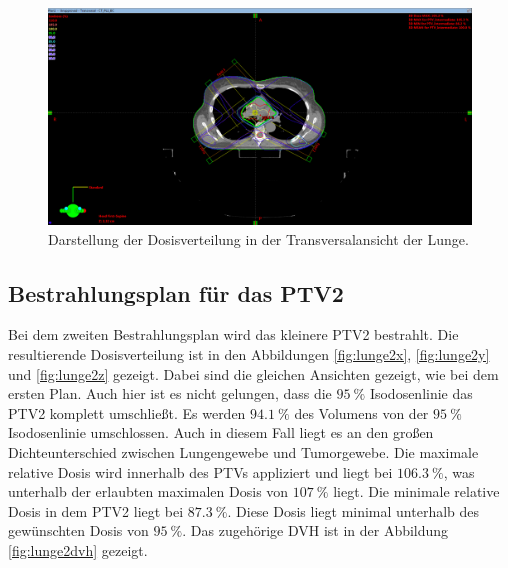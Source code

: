 \begin{figure}[H]
	\centering
	\includegraphics[width=\linewidth]{Bilder/Lunge1_Z}
	\caption{Darstellung der Dosisverteilung in der Transversalansicht  der Lunge.}
	\label{fig:lunge1z}
\end{figure}

\subsection*{Bestrahlungsplan für das PTV2}

Bei dem zweiten Bestrahlungsplan wird das kleinere PTV2 bestrahlt.
Die resultierende Dosisverteilung ist in den Abbildungen \ref{fig:lunge2x}, \ref{fig:lunge2y}
und \ref{fig:lunge2z} gezeigt. Dabei sind die gleichen Ansichten gezeigt, wie bei dem ersten Plan.
Auch hier ist es nicht gelungen, dass die $\SI{95}{\percent}$ Isodosenlinie das PTV2 komplett umschließt.
Es werden $\SI{94,1}{\percent}$ des Volumens von der $\SI{95}{\percent}$ Isodosenlinie umschlossen.
Auch in diesem Fall liegt es an den großen Dichteunterschied zwischen Lungengewebe und Tumorgewebe.
Die maximale relative Dosis wird innerhalb des PTVs appliziert und liegt bei $\SI{106.3}{\percent}$,
was unterhalb der erlaubten maximalen Dosis von $\SI{107}{\percent}$ liegt. Die minimale relative Dosis in dem PTV2 liegt bei $\SI{87.3}{\percent}$.
Diese Dosis liegt minimal unterhalb des gewünschten Dosis von $\SI{95}{\percent}$.
Das zugehörige DVH ist in der Abbildung \ref{fig:lunge2dvh} gezeigt.


